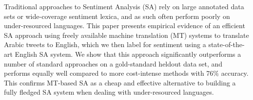 Traditional approaches to Sentiment Analysis (SA) rely on large annotated data sets or wide-coverage sentiment lexica, and as such often perform poorly on under-resourced languages. This paper presents empirical evidence of an efficient SA approach using freely available machine translation (MT) systems to translate Arabic tweets to English, which we then label for sentiment using a state-of-the-art English SA system. We show that this approach significantly outperforms a number of standard approaches on a gold-standard heldout data set, and performs equally well compared to more cost-intense methods with 76\% accuracy. This confirms MT-based SA as a cheap and effective alternative to building a fully fledged SA system when dealing with under-resourced languages.
